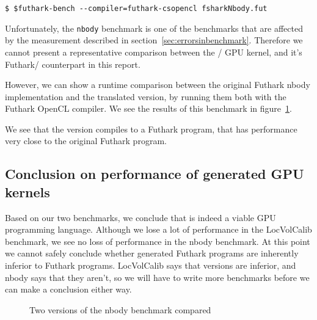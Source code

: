 \begin{verbatim}
$ $futhark-bench --compiler=futhark-csopencl fsharkNbody.fut
\end{verbatim}

Unfortunately, the \texttt{nbody} benchmark is one of the benchmarks that are
affected by the measurement described in section~\ref{sec:errorsinbenchmark}.
Therefore we cannot present a representative comparison between the
\fshark{}/\csharp{} GPU kernel, and it's Futhark/\clang{} counterpart in this report.

However, we can show a runtime comparison between the original Futhark nbody
implementation and the translated \fshark{} version, by running them both with
the Futhark \clang{} OpenCL compiler. We see the results of this benchmark in
figure~\ref{fig:nbodygraphh}.

We see that the \fshark{} version compiles to a Futhark program, that has
performance very close to the original Futhark program.

\subsection{Conclusion on performance of \fshark{} generated GPU kernels}
\label{sec:fsharkgpubenchmarks}
Based on our two benchmarks, we conclude that \fshark{} is indeed a viable GPU
programming language. Although we lose a lot of performance in the LocVolCalib
benchmark, we see no loss of performance in the nbody benchmark.
At this point we cannot safely conclude whether \fshark{} generated Futhark
programs are inherently inferior to Futhark programs.
LocVolCalib says that \fshark{} versions are inferior, and nbody says that they
aren't, so we will have to write more benchmarks before we can make a conclusion
either way.

\begin{figure}
    \caption{Two versions of the nbody benchmark compared}
    \label{fig:nbodygraphh}
\end{figure}

